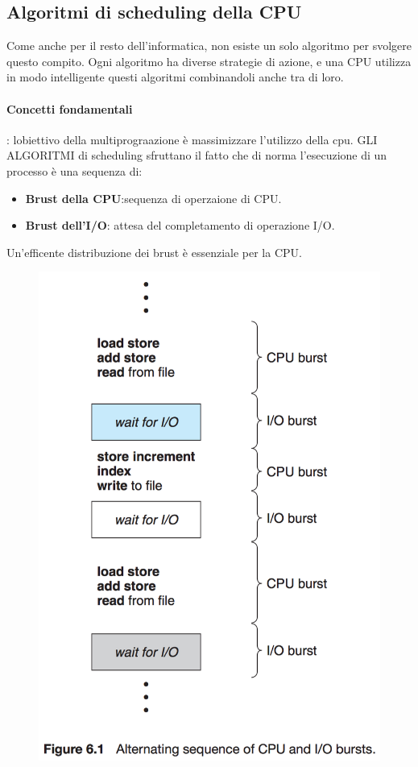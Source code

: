 \documentclass[11pt]{article}
\begin{document}
\subsection{Algoritmi di scheduling della CPU}
Come anche per il resto dell'informatica, non esiste un solo algoritmo per svolgere questo compito. Ogni algoritmo ha diverse strategie di azione, e una CPU utilizza in modo intelligente questi algoritmi combinandoli anche tra di loro.

\paragraph{Concetti fondamentali}: lobiettivo della multiprograazione è massimizzare l'utilizzo della cpu. GLI ALGORITMI di scheduling sfruttano il fatto che di norma l'esecuzione di un processo è una sequenza di:
\begin{itemize}
	\item \textbf{Brust della CPU}:sequenza di operzaione di CPU.
	\item \textbf{Brust dell'I/O}: attesa del completamento di operazione I/O.
\end{itemize}
Un'efficente distribuzione dei brust è essenziale per la CPU.
\begin{figure}[H]
\includegraphics[scale=0.4]{burst.png}
\centering
\end{figure}
\end{document}
